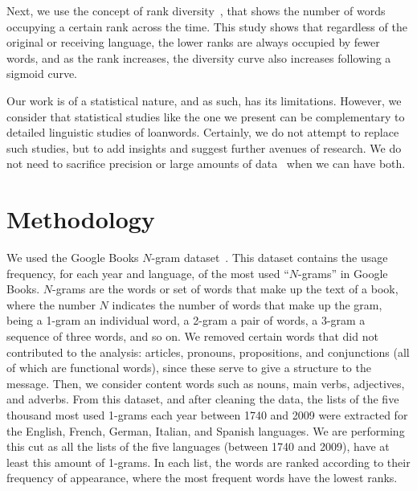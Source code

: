 \documentclass[10pt,letterpaper]{article} %
\begin{document}
Next, we use the concept of rank diversity~\cite{iplosone},  that shows the number of words
occupying a certain rank across the time. This study shows that  regardless of
the original or receiving language,  the lower ranks are always occupied by
fewer words, and as the rank increases, the diversity curve also increases following a sigmoid curve. 

Our work is of a statistical nature, and as such, has its limitations. However, we consider that statistical studies like the one we present can be complementary to detailed linguistic studies of loanwords. Certainly, we do not attempt to replace such studies, but to add insights and suggest further avenues of research. We do not need to sacrifice precision or large amounts of data~\cite{Harford2014} when we can have both.




\section*{Methodology} %

We used the Google Books $N$-gram dataset~\cite{ngramv}.
This dataset contains the usage frequency, for each year and language, of
the most used ``$N$-grams'' in Google Books. 
$N$-grams are the words or set of words that make up the text of a
book, where the number $N$ indicates the number of words that make up the gram,
being a 1-gram an individual word, a 2-gram a pair of words,
a 3-gram a sequence of three words, and so on.
We removed certain words that did not contributed to the analysis: articles,
pronouns, propositions, and conjunctions (all  of which are functional words),
since these serve to give a structure to the message. Then, we consider content
words such as nouns, main verbs, adjectives, and adverbs. 
From this dataset, and after cleaning the data, the lists of the five thousand
most used 1-grams each year
between 1740 and 2009 were extracted for the English, French, German, Italian,
and Spanish languages.
We are performing this cut as all the lists of the five languages (between 1740
and 2009), have at least this amount of 1-grams.
In each list, the words are ranked according to their
frequency of appearance, where the most frequent words have the lowest ranks.
\end{document}
